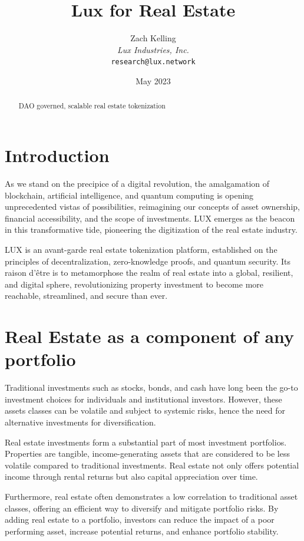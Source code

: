 \documentclass[11pt]{article}
\title{Lux for Real Estate}
\author{Zach Kelling\\\textit{Lux Industries, Inc.}\\\texttt{research@lux.network}}
\date{May 2023}
\begin{document}
\luxcoverpage

\begin{abstract}
DAO governed, scalable real estate tokenization
\end{abstract}

\tableofcontents
\newpage


\section{Introduction}

As we stand on the precipice of a digital revolution, the amalgamation of blockchain, artificial intelligence, and quantum computing is opening unprecedented vistas of possibilities, reimagining our concepts of asset ownership, financial accessibility, and the scope of investments. LUX emerges as the beacon in this transformative tide, pioneering the digitization of the real estate industry.


LUX is an avant-garde real estate tokenization platform, established on the principles of decentralization, zero-knowledge proofs, and quantum security. Its raison d'être is to metamorphose the realm of real estate into a global, resilient, and digital sphere, revolutionizing property investment to become more reachable, streamlined, and secure than ever.


\section{Real Estate as a component of any portfolio}

Traditional investments such as stocks, bonds, and cash have long been the go-to investment choices for individuals and institutional investors. However, these assets classes can be volatile and subject to systemic risks, hence the need for alternative investments for diversification.


Real estate investments form a substantial part of most investment portfolios. Properties are tangible, income-generating assets that are considered to be less volatile compared to traditional investments. Real estate not only offers potential income through rental returns but also capital appreciation over time.


Furthermore, real estate often demonstrates a low correlation to traditional asset classes, offering an efficient way to diversify and mitigate portfolio risks. By adding real estate to a portfolio, investors can reduce the impact of a poor performing asset, increase potential returns, and enhance portfolio stability.
\end{document}
